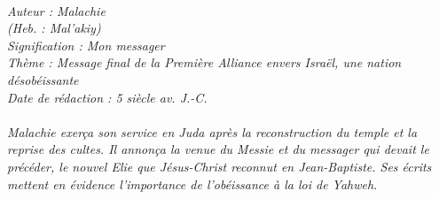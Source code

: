 \BFont
\noindent\hrulefill
{\footnotesize
\textit{
\bigskip
{\centering{}
\\Auteur : Malachie
\\(Heb. : Mal'akiy)
\\Signification : Mon messager
\\Thème : Message final de la Première Alliance envers Israël, une nation désobéissante
\\Date de rédaction : 5 siècle av. J.-C.\\}
}
\textit{
\\Malachie exerça son service en Juda après la reconstruction du temple et la reprise des cultes. Il annonça la venue du Messie et du messager qui devait le précéder, le nouvel Elie que Jésus-Christ reconnut en Jean-Baptiste. Ses écrits mettent en évidence l'importance de l'obéissance à la loi de Yahweh.\bigskip
}
}
\par\nobreak\noindent\hrulefill
